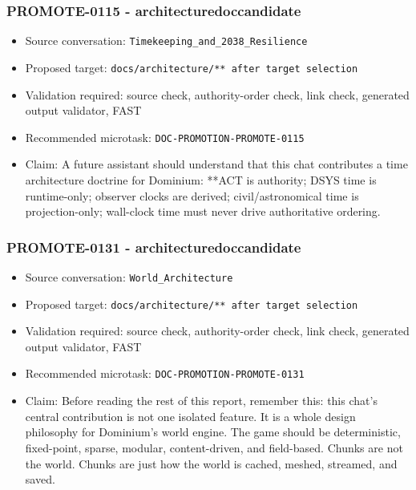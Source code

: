 \documentclass[9pt,a4paper,openany]{book}
\begin{document}
\subsubsection{PROMOTE-0115 - architecturedoccandidate}

\begin{itemize}
\item Source conversation: \texttt{Timekeeping\_\allowbreak{}and\_\allowbreak{}2038\_\allowbreak{}Resilience}
\item Proposed target: \texttt{docs/\allowbreak{}architecture/\allowbreak{}** after target selection}
\item Validation required: source check, authority-\allowbreak{}order check, link check, generated output validator, FAST
\item Recommended microtask: \texttt{DOC-\allowbreak{}PROMOTION-\allowbreak{}PROMOTE-\allowbreak{}0115}
\item Claim: A future assistant should understand that this chat contributes a time architecture doctrine for Dominium: **ACT is authority; DSYS time is runtime-\allowbreak{}only; observer clocks are derived; civil/\allowbreak{}astronomical time is projection-\allowbreak{}only; wall-\allowbreak{}clock time must never drive authoritative ordering.\allowbreak{}
\end{itemize}

\subsubsection{PROMOTE-0131 - architecturedoccandidate}

\begin{itemize}
\item Source conversation: \texttt{World\_\allowbreak{}Architecture}
\item Proposed target: \texttt{docs/\allowbreak{}architecture/\allowbreak{}** after target selection}
\item Validation required: source check, authority-\allowbreak{}order check, link check, generated output validator, FAST
\item Recommended microtask: \texttt{DOC-\allowbreak{}PROMOTION-\allowbreak{}PROMOTE-\allowbreak{}0131}
\item Claim: Before reading the rest of this report, remember this: this chat's central contribution is not one isolated feature.\allowbreak{} It is a whole design philosophy for Dominium's world engine.\allowbreak{} The game should be deterministic, fixed-\allowbreak{}point, sparse, modular, content-\allowbreak{}driven, and field-\allowbreak{}based.\allowbreak{} Chunks are not the world.\allowbreak{} Chunks are just how the world is cached, meshed, streamed, and saved.\allowbreak{}
\end{itemize}
\end{document}
